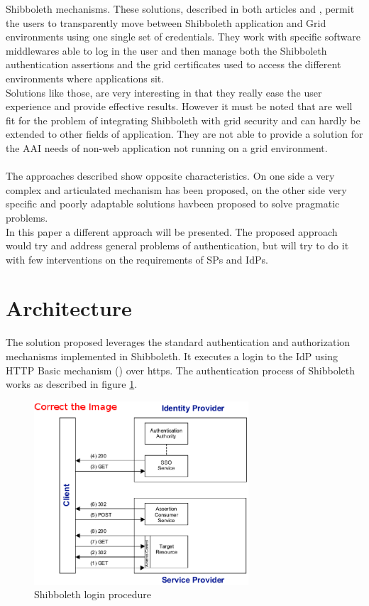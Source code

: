 Shibboleth mechanisms.
These solutions, described in both articles \cite{Wang-2009} and \cite{Jensen-2007}, permit the users to transparently move between Shibboleth application and Grid
environments using one single set of credentials.
They work with specific software middlewares able to log in the user and then manage both the Shibboleth authentication assertions and the
grid certificates used to access the different environments where applications sit.\\
Solutions like those, are very interesting in that they really ease the user experience and provide effective results.
However it must be noted that are well fit for the problem of integrating Shibboleth with grid security and can hardly be extended to other
fields of application.
They are not able to provide a solution for the AAI needs of non-web application not running on a grid environment.\\
\\
The approaches described show opposite characteristics.
On one side a very complex and articulated mechanism has been proposed, on the other side very specific and poorly adaptable solutions havbeen proposed to solve pragmatic problems.\\
In this paper a different approach will be presented.
The proposed approach would try and address general problems of authentication, but will try to do it with few interventions on the
requirements of SPs and IdPs.

\label{sec:architecture}
\section{Architecture}
The solution proposed leverages the standard authentication and authorization mechanisms implemented in Shibboleth.
It executes a login to the IdP using HTTP Basic mechanism (\cite{Franks-1999}) over https.
The authentication process of Shibboleth works as described in figure \ref{fig:shiblogin}.

\begin{figure}[h]
\centering
\includegraphics[width=8cm]{Fig1shiblogin.eps}
\caption{Shibboleth login procedure}
\label{fig:shiblogin}
\end{figure}

